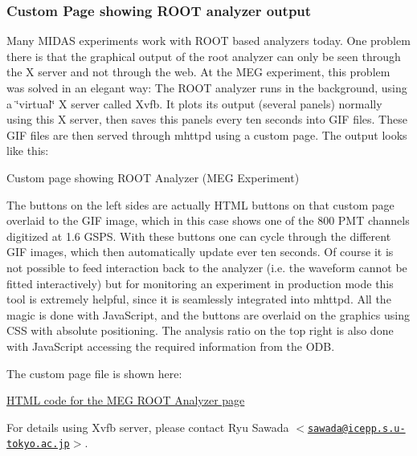 \subsubsection{Custom Page showing ROOT analyzer output}\label{RC_ROOT_analyzer_page}
\label{RC_ROOT_analyzer_page_idx_mhttpd_page_custom_examples_ROOT}
\hypertarget{RC_ROOT_analyzer_page_idx_mhttpd_page_custom_examples_ROOT}{}
 \par
 

Many MIDAS experiments work with ROOT based analyzers today. One problem there is that the graphical output of the root analyzer can only be seen through the X server and not through the web. At the MEG experiment, this problem was solved in an elegant way: The ROOT analyzer runs in the background, using a \char`\"{}virtual\char`\"{} X server called Xvfb. It plots its output (several panels) normally using this X server, then saves this panels every ten seconds into GIF files. These GIF files are then served through mhttpd using a custom page. The output looks like this:

\par
 \begin{center} Custom page showing ROOT Analyzer (MEG Experiment)  \end{center}  \par
 The buttons on the left sides are actually HTML buttons on that custom page overlaid to the GIF image, which in this case shows one of the 800 PMT channels digitized at 1.6 GSPS. With these buttons one can cycle through the different GIF images, which then automatically update ever ten seconds. Of course it is not possible to feed interaction back to the analyzer (i.e. the waveform cannot be fitted interactively) but for monitoring an experiment in production mode this tool is extremely helpful, since it is seamlessly integrated into mhttpd. All the magic is done with JavaScript, and the buttons are overlaid on the graphics using CSS with absolute positioning. The analysis ratio on the top right is also done with JavaScript accessing the required information from the ODB. \par


The custom page file is shown here:


\begin{DoxyItemize}
\item \hyperlink{RC_MEG_ROOT_code}{HTML code for the MEG ROOT Analyzer page}
\end{DoxyItemize}

For details using Xvfb server, please contact Ryu Sawada $<$\href{mailto:sawada@icepp.s.u-tokyo.ac.jp}{\tt sawada@icepp.s.u-\/tokyo.ac.jp}$>$.

